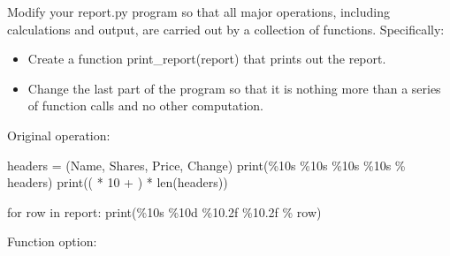 \documentclass[
  letterpaper,
  DIV=11,
  numbers=noendperiod]{scrreprt}
\newenvironment{Shaded}{\begin{snugshade}}{\end{snugshade}}
\newcommand{\BuiltInTok}[1]{\textcolor[rgb]{0.00,0.46,0.62}{#1}}
\newcommand{\ControlFlowTok}[1]{\textcolor[rgb]{0.00,0.46,0.62}{#1}}
\newcommand{\DecValTok}[1]{\textcolor[rgb]{0.68,0.00,0.00}{#1}}
\newcommand{\KeywordTok}[1]{\textcolor[rgb]{0.00,0.46,0.62}{#1}}
\newcommand{\NormalTok}[1]{\textcolor[rgb]{0.00,0.46,0.62}{#1}}
\newcommand{\OperatorTok}[1]{\textcolor[rgb]{0.37,0.37,0.37}{#1}}
\newcommand{\SpecialCharTok}[1]{\textcolor[rgb]{0.37,0.37,0.37}{#1}}
\newcommand{\StringTok}[1]{\textcolor[rgb]{0.13,0.47,0.30}{#1}}
\providecommand{\tightlist}{%
  \setlength{\itemsep}{0pt}\setlength{\parskip}{0pt}}
\begin{document}
Modify your report.py program so that all major operations, including
calculations and output, are carried out by a collection of functions.
Specifically:

\begin{itemize}
\tightlist
\item
  Create a function print\_report(report) that prints out the report.
\item
  Change the last part of the program so that it is nothing more than a
  series of function calls and no other computation.
\end{itemize}

Original operation:

\begin{Shaded}
\begin{Highlighting}[]
\NormalTok{headers }\OperatorTok{=}\NormalTok{ (}\StringTok{\textquotesingle{}Name\textquotesingle{}}\NormalTok{, }\StringTok{\textquotesingle{}Shares\textquotesingle{}}\NormalTok{, }\StringTok{\textquotesingle{}Price\textquotesingle{}}\NormalTok{, }\StringTok{\textquotesingle{}Change\textquotesingle{}}\NormalTok{)}
\BuiltInTok{print}\NormalTok{(}\StringTok{\textquotesingle{}}\SpecialCharTok{\%10s}\StringTok{ }\SpecialCharTok{\%10s}\StringTok{ }\SpecialCharTok{\%10s}\StringTok{ }\SpecialCharTok{\%10s}\StringTok{\textquotesingle{}}  \OperatorTok{\%}\NormalTok{ headers)}
\BuiltInTok{print}\NormalTok{((}\StringTok{\textquotesingle{}{-}\textquotesingle{}} \OperatorTok{*} \DecValTok{10} \OperatorTok{+} \StringTok{\textquotesingle{} \textquotesingle{}}\NormalTok{) }\OperatorTok{*} \BuiltInTok{len}\NormalTok{(headers))}

\ControlFlowTok{for}\NormalTok{ row }\KeywordTok{in}\NormalTok{ report:}
    \BuiltInTok{print}\NormalTok{(}\StringTok{\textquotesingle{}}\SpecialCharTok{\%10s}\StringTok{ }\SpecialCharTok{\%10d}\StringTok{ }\SpecialCharTok{\%10.2f}\StringTok{ }\SpecialCharTok{\%10.2f}\StringTok{\textquotesingle{}} \OperatorTok{\%}\NormalTok{ row)}
\end{Highlighting}
\end{Shaded}

Function option:
\end{document}
